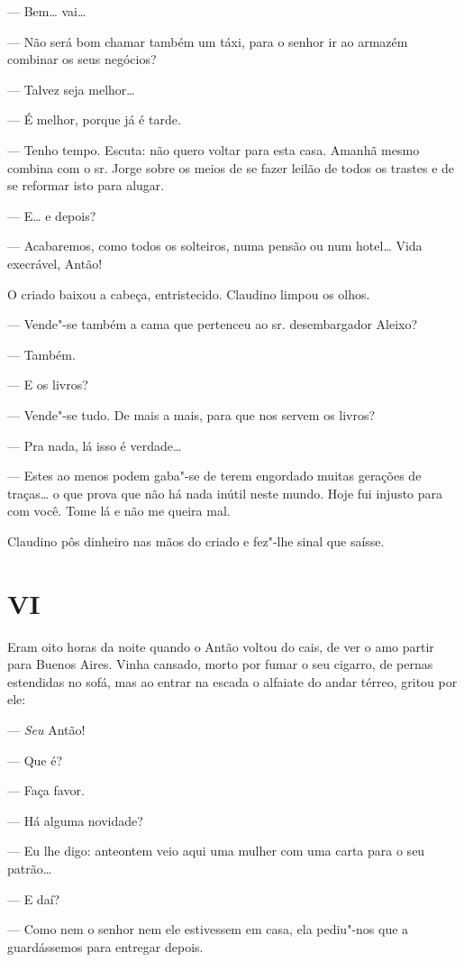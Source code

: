 --- Bem\ldots{} vai\ldots{}

--- Não será bom chamar também um táxi, para o senhor ir ao armazém
combinar os seus negócios?

--- Talvez seja melhor\ldots{}

--- É melhor, porque já é tarde.

--- Tenho tempo. Escuta: não quero voltar para esta casa. Amanhã mesmo
combina com o sr. Jorge sobre os meios de se fazer leilão de todos os
trastes e de se reformar isto para alugar.

--- E\ldots{} e depois?

--- Acabaremos, como todos os solteiros, numa pensão ou num hotel\ldots{}
Vida execrável, Antão!

O criado baixou a cabeça, entristecido. Claudino limpou os olhos.

--- Vende"-se também a cama que pertenceu ao sr. desembargador Aleixo?

--- Também.

--- E os livros?

--- Vende"-se tudo. De mais a mais, para que nos servem os livros?

--- Pra nada, lá isso é verdade\ldots{}

--- Estes ao menos podem gaba"-se de terem engordado muitas gerações de
traças\ldots{} o que prova que não há nada inútil neste mundo. Hoje fui
injusto para com você. Tome lá e não me queira mal.

Claudino pôs dinheiro nas mãos do criado e fez"-lhe sinal que saísse.

\section{VI}

Eram oito horas da noite quando o Antão voltou do cais, de ver o amo
partir para Buenos Aires. Vinha cansado, morto por fumar o seu cigarro,
de pernas estendidas no sofá, mas ao entrar na escada o alfaiate do
andar térreo, gritou por ele:

--- \emph{Seu} Antão!

--- Que é?

--- Faça favor.

--- Há alguma novidade?

--- Eu lhe digo: anteontem veio aqui uma mulher com uma carta para o seu
patrão\ldots{}

--- E daí?

--- Como nem o senhor nem ele estivessem em casa, ela pediu"-nos que a
guardássemos para entregar depois.

